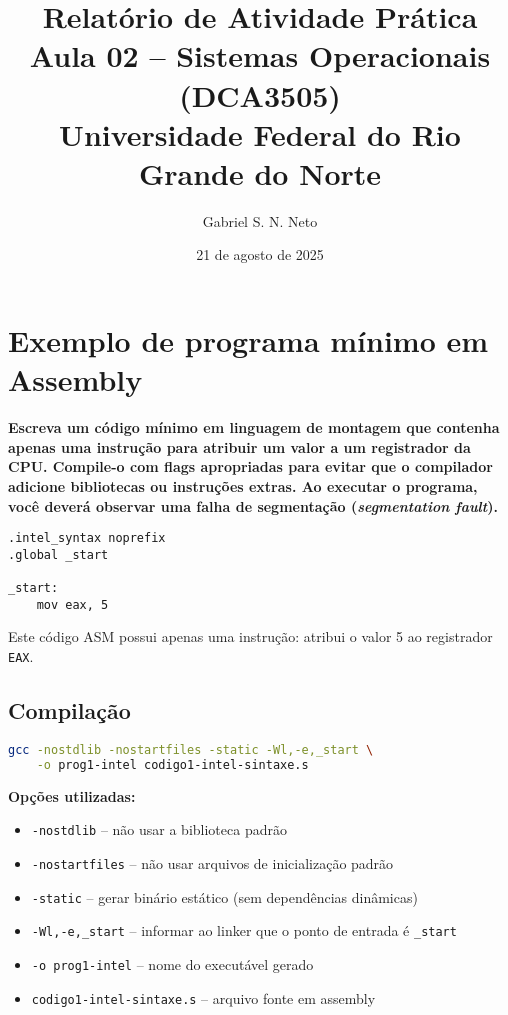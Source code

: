 \documentclass[12pt]{article}
\title{\textbf{Relatório de Atividade Prática \\ Aula 02 – Sistemas Operacionais (DCA3505)} \\[0.5em]
\large Universidade Federal do Rio Grande do Norte}
\author{Gabriel S. N. Neto}
\date{21 de agosto de 2025}
\begin{document}
\maketitle
\vspace{2em} 

\section*{Exemplo de programa mínimo em Assembly}

\textbf{Escreva um código mínimo em linguagem de montagem que contenha apenas uma instrução
para atribuir um valor a um registrador da CPU. Compile-o com flags apropriadas para
evitar que o compilador adicione bibliotecas ou instruções extras. Ao executar o programa,
você deverá observar uma falha de segmentação (\textit{segmentation fault}).}

\vspace{1em}

\begin{lstlisting}[style=modern, language={[x86masm]Assembler}]
.intel_syntax noprefix
.global _start

_start:
    mov eax, 5
\end{lstlisting}

Este código ASM possui apenas uma instrução: atribui o valor 5 ao registrador \texttt{EAX}.  

\subsection*{Compilação}

\begin{lstlisting}[style=modern, language=bash]
gcc -nostdlib -nostartfiles -static -Wl,-e,_start \
    -o prog1-intel codigo1-intel-sintaxe.s
\end{lstlisting}

\textbf{Opções utilizadas:}

\begin{itemize}
  \item \texttt{-nostdlib} – não usar a biblioteca padrão
  \item \texttt{-nostartfiles} – não usar arquivos de inicialização padrão
  \item \texttt{-static} – gerar binário estático (sem dependências dinâmicas)
  \item \texttt{-Wl,-e,\_start} – informar ao linker que o ponto de entrada é \texttt{\_start}
  \item \texttt{-o prog1-intel} – nome do executável gerado
  \item \texttt{codigo1-intel-sintaxe.s} – arquivo fonte em assembly
\end{itemize}
\end{document}
